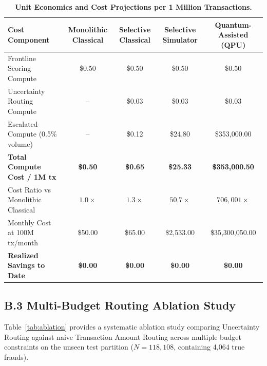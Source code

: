 \documentclass[10pt,a4paper]{article}
\begin{document}
\vspace{-2pt}
\begin{table}[h!]
\centering
\scriptsize
\renewcommand{\arraystretch}{0.76}
\caption{\textbf{Unit Economics and Cost Projections per 1 Million Transactions.}}
\label{tab:econ_bench}
\vspace{1pt}
\begin{tabularx}{\linewidth}{@{}lcccc@{}}
\toprule
\textbf{Cost Component} & \textbf{Monolithic Classical} & \textbf{Selective Classical} & \textbf{Selective Simulator} & \textbf{Quantum-Assisted (QPU)} \\
\midrule
Frontline Scoring Compute & \$0.50 & \$0.50 & \$0.50 & \$0.50 \\
Uncertainty Routing Compute & -- & \$0.03 & \$0.03 & \$0.03 \\
Escalated Compute (0.5\% volume) & -- & \$0.12 & \$24.80 & \$353,000.00 \\
\textbf{Total Compute Cost / 1M tx} & \textbf{\$0.50} & \textbf{\$0.65} & \textbf{\$25.33} & \textbf{\$353,000.50} \\
Cost Ratio vs Monolithic Classical & $1.0\times$ & $1.3\times$ & $50.7\times$ & $706,001\times$ \\
Monthly Cost at 100M tx/month & \$50.00 & \$65.00 & \$2,533.00 & \$35,300,050.00 \\
\midrule
\textbf{Realized Savings to Date} & \textbf{\$0.00} & \textbf{\$0.00} & \textbf{\$0.00} & \textbf{\$0.00} \\
\bottomrule
\end{tabularx}
\end{table}
\vspace{-5pt}

\subsection*{B.3 Multi-Budget Routing Ablation Study}
Table~\ref{tab:ablation} provides a systematic ablation study comparing Uncertainty Routing against naive Transaction Amount Routing across multiple budget constraints on the unseen test partition ($N=118,108$, containing 4,064 true frauds).
\end{document}
